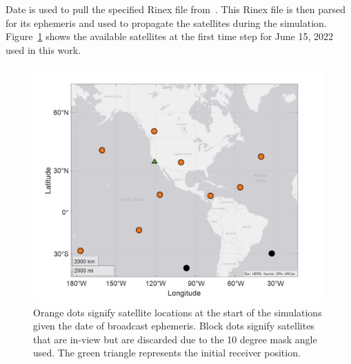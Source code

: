 Date is used to pull the specified Rinex file from~\cite{nollCrustalDynamicsData2010}. This Rinex file is then parsed for its ephemeris and used to propagate the satellites during the simulation. Figure~\ref{fig:skyplot} shows the available satellites at the first time step for June 15, 2022 used in this work.

\begin{figure}[!ht]
    \centering
    \includegraphics[width=0.8\linewidth]{Figures/Results/skyplot.png}
    \caption{Orange dots signify satellite locations at the start of the simulations given the date of broadcast ephemeris. Block dots signify satellites that are in-view but are discarded due to the 10 degree mask angle used. The green triangle represents the initial receiver position.}\label{fig:skyplot}
\end{figure}

